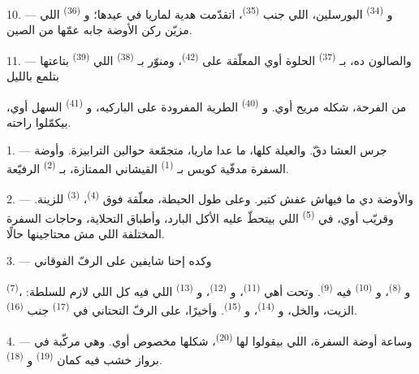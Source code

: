 10. --- و \textsuperscript{(34)} البورسلين، اللي جنب
 \textsuperscript{(35)}، اتقدّمت هدية لماريا في عيدها؛
و \textsuperscript{(36)} اللي مزيّن ركن الأوضة جابه عمّها من الصين.

11. --- والصالون ده، بـ \textsuperscript{(37)} الحلوة أوي المعلّقة على
 \textsuperscript{(42)}، ومنوّر بـ \textsuperscript{(38)} اللي
 \textsuperscript{(39)} بتاعتها بتلمع بالليل

من الفرحة، شكله مريح أوي. و \textsuperscript{(40)} الطرية المفرودة
على الباركيه، و \textsuperscript{(41)} السهل أوي، بيكمّلوا راحته.

\VUsaut{3.6mm}
\VUsaut{3.0mm}

1. --- جرس العشا دقّ. والعيلة كلها، ما عدا ماريا، متجمّعة حوالين الترابيزة.
وأوضة السفرة مدفّية كويس بـ \textsuperscript{(1)} القيشاني الممتازة،
بـ \textsuperscript{(2)} الرفيّعة.

2. --- والأوضة دي ما فيهاش عفش كتير. وعلى طول الحيطة، معلّقة فوق
 \textsuperscript{(4)}،  \textsuperscript{(3)} للزينة.
وقريّب أوي، في  \textsuperscript{(5)} اللي بيتحطّ عليه الأكل البارد،
وأطباق التحلاية، وحاجات السفرة المختلفة اللي مش محتاجينها حالًا.

3. --- وكده إحنا شايفين على الرفّ الفوقاني

 \textsuperscript{(7)}، و \textsuperscript{(8)}،
و \textsuperscript{(10)} فيه  \textsuperscript{(9)}. وتحت أهي
 \textsuperscript{(11)}، و \textsuperscript{(12)}، و \textsuperscript{(13)} اللي فيه كل اللي لازم للسلطة: الزيت، والخل،
و \textsuperscript{(14)}، و \textsuperscript{(15)}. وأخيرًا، على
الرفّ التحتاني في  \textsuperscript{(17)} جنب 
\textsuperscript{(16)}.

4. --- وساعة أوضة السفرة، اللي بيقولوا لها 
\textsuperscript{(20)}، شكلها مخصوص أوي. وهي مركّبة في برواز خشب فيه كمان
 \textsuperscript{(19)} و \textsuperscript{(18)}.

\VUsaut{4.6mm}
\VUsaut{3.0mm}

